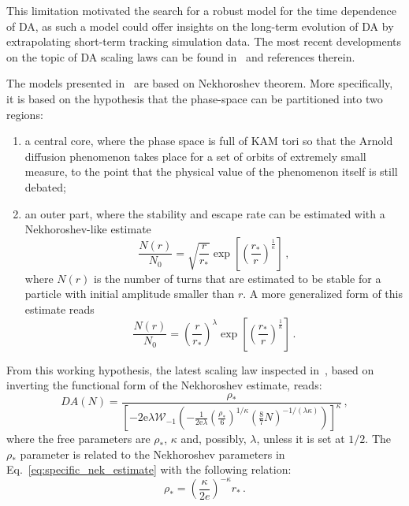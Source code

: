 This limitation motivated the search for a robust model for the time dependence of DA, as such a model could offer insights on the long-term evolution of DA by extrapolating short-term tracking simulation data. The most recent developments on the topic of DA scaling laws can be found in~\cite{Bazzani:2019csk} and references therein.

The models presented in~\cite{Bazzani:2019csk} are based on  Nekhoroshev theorem. More specifically, it is based on the hypothesis that the phase-space can be partitioned into two regions: 
\begin{enumerate}
	\item a central core, where the phase space is full of KAM tori so that the Arnold diffusion phenomenon takes place for a set of orbits of extremely small measure, to the point that the physical value of the phenomenon itself is still debated;
	\item an outer part, where the stability and escape rate can be estimated with a Nekhoroshev-like estimate
	\begin{equation}
		\frac{N(r)}{N_0} = \sqrt{\frac{r}{r_\ast}} \exp\left[\left(\frac{r_\ast}{r}\right)^{\frac{1}{\kappa}}\right]\,,
        \label{eq:specific_nek_estimate}
	\end{equation}
	where \(N(r)\) is the number of turns that are estimated to be stable for a particle with initial amplitude smaller than \(r\). A more generalized form of this estimate reads
    \begin{equation}
        \frac{N(r)}{N_0} = \left(\frac{r}{r_\ast}\right)^{\lambda} \exp\left[\left(\frac{r_\ast}{r}\right)^{\frac{1}{\kappa}}\right]\,.
    \end{equation}
\end{enumerate}

From this working hypothesis, the latest scaling law inspected in~\cite{Bazzani:2019csk}, based on inverting the functional form of the Nekhoroshev estimate, reads:
\begin{equation}
	DA(N) = \frac{\rho_\ast}{\left[-2 \mathrm{e} \lambda \mathcal{W}_{-1}\left(-\frac{1}{2 \mathrm{e} \lambda}\left(\frac{\rho_*}{6}\right)^{1 / \kappa}\left(\frac{8}{7} N\right)^{-1 /(\lambda \kappa)}\right)\right]^\kappa}\,,
	\label{eq:giova_interpolation}
\end{equation}
where the free parameters are $\rho_\ast$, $\kappa$ and, possibly, $\lambda$, unless it is set at $1/2$. The $\rho_\ast$ parameter is related to the Nekhoroshev parameters in Eq.~\eqref{eq:specific_nek_estimate} with the following relation:
\begin{equation}
    \rho_\ast = \left(\frac{\kappa}{2e}\right)^{-\kappa} r_\ast \,.
\end{equation}

